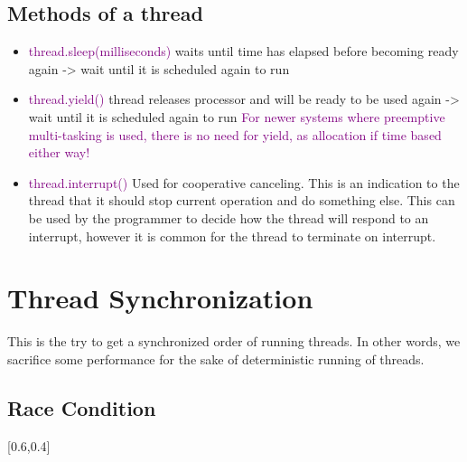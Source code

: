 \documentclass[main.tex,fontsize=8pt,paper=a4,paper=portrait,DIV=calc,]{scrartcl}
\begin{document}
\subsection{Methods of a thread}
\begin{itemize}
\item \textcolor{purple}{thread.sleep(milliseconds)}\newline
  waits until time has elapsed before becoming ready again -> wait until it is scheduled again to run
\item \textcolor{purple}{thread.yield()}\newline
  thread releases processor and will be ready to be used again -> wait until it is scheduled again to run\newline
  \textcolor{purple}{For newer systems where preemptive multi-tasking is used, there is no need for yield, as allocation if time based either way!}
\item \textcolor{purple}{thread.interrupt()}\newline
  Used for cooperative canceling.\newline
  This is an indication to the thread that it should stop current operation and do something else.\newline
  This can be used by the programmer to decide how the thread will respond to an interrupt, however it is common for the thread to terminate on interrupt.
\end{itemize} 

\section{Thread Synchronization}
This is the try to get a synchronized order of running threads.\newline
In other words, we sacrifice some performance for the sake of deterministic running of threads.

\subsection{Race Condition}
[0.6,0.4]
\end{document}
